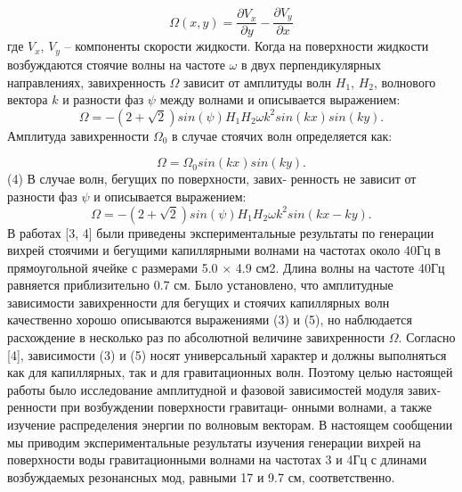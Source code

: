 \begin{equation}
\Omega(x, y) = \frac{\partial V_x}{\partial y} - \frac{\partial V_y}{\partial x}
\end{equation}
где $V_x$, $V_y$ – компоненты скорости жидкости. Когда на поверхности жидкости возбуждаются стоячие волны на частоте $\omega$ в двух перпендикулярных направлениях, завихренность $\Omega$ зависит от амплитуды волн $H_1$, $H_2$, волнового вектора $k$ и разности фаз $\psi$ между волнами и описывается выражением:
\begin{equation}
\Omega = -(2+\sqrt{2}) sin(\psi) H_1 H_2 \omega k^2 sin(kx) sin(ky).
\end{equation}
Амплитуда завихренности $\Omega_0$ в случае стоячих волн определяется как:

\begin{equation}
\Omega = \Omega_0 sin(kx) sin(ky).
\end{equation}
(4) В случае волн, бегущих по поверхности, завих-
ренность не зависит от разности фаз $\psi$ и описывается выражением:
\begin{equation}
\Omega = -(2+\sqrt{2}) sin(\psi) H_1 H_2 \omega k^2 sin(kx - ky).
\end{equation}
В работах [3, 4] были приведены экспериментальные результаты по генерации вихрей стоячими и бегущими капиллярными волнами на частотах около 40Гц в прямоугольной ячейке с размерами 5.0 $\times$ 4.9 см2. Длина волны на частоте 40Гц равняется приблизительно 0.7 см. Было установлено, что амплитудные зависимости завихренности для бегущих и стоячих капиллярных волн качественно хорошо описываются выражениями (3) и (5), но наблюдается расхождение в несколько раз по абсолютной величине завихренности $\Omega$. Согласно [4], зависимости (3) и (5) носят универсальный характер и должны выполняться как для капиллярных, так и для гравитационных волн. Поэтому целью настоящей работы было исследование амплитудной и фазовой зависимостей модуля завих- ренности при возбуждении поверхности гравитаци- онными волнами, а также изучение распределения энергии по волновым векторам. В настоящем сообщении мы приводим экспериментальные результаты изучения генерации вихрей на поверхности воды гравитационными волнами на частотах 3 и 4Гц с длинами возбуждаемых резонансных мод, равными 17 и 9.7 см, соответственно.



